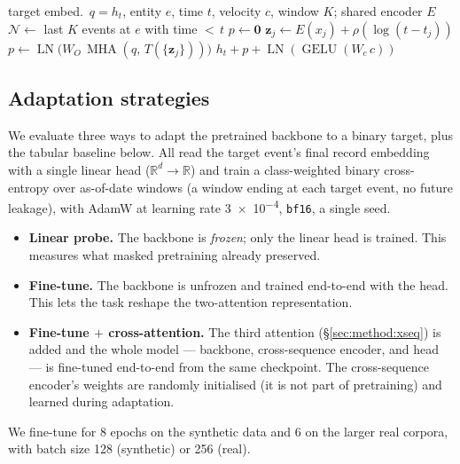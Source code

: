 \begin{algorithm}[t]
\caption{Cross-sequence attention for one target event}
\label{alg:xseq}
\begin{algorithmic}[1]
\Require target embed.\ $q{=}h_t$, entity $e$, time $t$, velocity $c$, window $K$; shared encoder $E$
\State $\mathcal{N} \gets$ last $K$ events at $e$ with time ${<}\,t$ 
 \State $p \gets \mathbf{0}$
\Else
   \State $\mathbf{z}_j \gets E(x_j) + \rho(\log(t-t_j))$ \EndFor
  \State $p \gets \operatorname{LN}\!\big(W_O\,\operatorname{MHA}(q,\,T(\{\mathbf{z}_j\}))\big)$
\EndIf
\State \Return $h_t + p + \operatorname{LN}(\operatorname{GELU}(W_c\,c))$
\end{algorithmic}
\end{algorithm}

\subsection{Adaptation strategies}
\label{sec:method:adapt}
We evaluate three ways to adapt the pretrained backbone to a binary target, plus the tabular baseline
below. All read the target event's final record embedding with a single linear head
($\mathbb{R}^{d}\!\to\!\mathbb{R}$) and train a class-weighted binary cross-entropy over as-of-date
windows (a window ending at each target event, no future leakage), with AdamW at learning rate
\num{3e-4}, \texttt{bf16}, a single seed.
\begin{itemize}
\item \textbf{Linear probe.} The backbone is \emph{frozen}; only the linear head is trained. This
measures what masked pretraining already preserved.
\item \textbf{Fine-tune.} The backbone is unfrozen and trained end-to-end with the head. This lets
the task reshape the two-attention representation.
\item \textbf{Fine-tune $+$ cross-attention.} The third attention (\S\ref{sec:method:xseq}) is added
and the whole model --- backbone, cross-sequence encoder, and head --- is fine-tuned end-to-end from
the same checkpoint. The cross-sequence encoder's weights are randomly initialised (it is not part of
pretraining) and learned during adaptation.
\end{itemize}
We fine-tune for \num{8} epochs on the synthetic data and \num{6} on the larger real corpora, with
batch size \num{128} (synthetic) or \num{256} (real).

